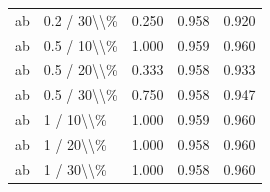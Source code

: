 \begin{table}[!h]
\begin{tabular}[t]{llccc}
\addlinespace
ab & 0.2 / 30\textbackslash{}\textbackslash{}\% & 0.250 & 0.958 & 0.920\\
ab & 0.5 / 10\textbackslash{}\textbackslash{}\% & 1.000 & 0.959 & 0.960\\
ab & 0.5 / 20\textbackslash{}\textbackslash{}\% & 0.333 & 0.958 & 0.933\\
ab & 0.5 / 30\textbackslash{}\textbackslash{}\% & 0.750 & 0.958 & 0.947\\
ab & 1 / 10\textbackslash{}\textbackslash{}\% & 1.000 & 0.959 & 0.960\\
\addlinespace
ab & 1 / 20\textbackslash{}\textbackslash{}\% & 1.000 & 0.958 & 0.960\\
ab & 1 / 30\textbackslash{}\textbackslash{}\% & 1.000 & 0.958 & 0.960\\
\bottomrule
\end{tabular}
\end{table}
